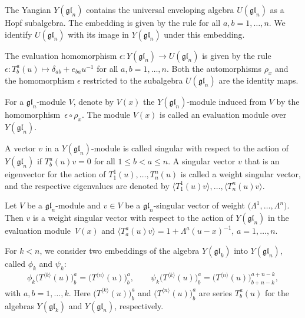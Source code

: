 \documentclass[10pt,a4paper]{amsart}
\numberwithin{equation}{section}
\begin{document}
The Yangian $Y(\mathfrak{g l}_{n})$ contains the universal enveloping algebra $U(\mathfrak{g l}_{n})$ as a Hopf subalgebra. The embedding is given by the rule  for all $a, b=1, \dots, n$. We identify $U(\mathfrak{g l}_{n})$ with its image in $Y(\mathfrak{g l}_{n})$ under this embedding.

The evaluation homomorphism $\epsilon\colon Y (\mathfrak{gl}_n) \rightarrow U(\mathfrak{gl}_n)$ is given by the rule $\epsilon\colon T_{b}^a(u) \mapsto \delta_{ab}+e_{ba}u^{-1}$ for all $a,b = 1,\dots,n$. Both the automorphisms $\rho_x$ and the homomorphism $\epsilon$ restricted to the subalgebra $U(\mathfrak{gl}_n)$ are the identity maps.

For a $\mathfrak{gl}_n$-module $V$, denote by $V(x)$ the $Y(\mathfrak{gl}_n)$-module induced from $V$ by the homomorphism~${\epsilon\circ \rho_x}$. The module $V(x)$ is called an evaluation module over $Y(\mathfrak{gl}_n)$.

A vector $v$ in a $Y(\mathfrak{gl}_n)$-module is called singular with respect to the action of $Y(\mathfrak{gl}_n)$ if ${T^{a}_{b}(u)v = 0}$ for all $1\leq b < a \leq n$. A singular vector $v$ that is an eigenvector for the action of $T_{1}^{1}(u),\dots,T_{n}^{n}(u)$ is called a weight singular vector, and the respective eigenvalues are denoted by $\bigl\langle T^1_{1}(u)v\bigr\rangle,\dots, \langle T^n_{n}(u)v\rangle$.

\begin{Example}%
Let $V$ be a $\mathfrak{g l}_{n}$-module and $v \in V$ be a $\mathfrak{gl}_n$-singular vector of weight $\bigl(\Lambda^{1}, \dots, \Lambda^{n}\bigr)$. Then $v$ is a weight singular vector with respect to the action of $Y(\mathfrak{g l}_{n})$ in the evaluation module~$V(x)$ and $\langle T^a_{ a}(u) v\rangle=1+\Lambda^{a}(u-x)^{-1}$, $a=1, \dots, n$.
\end{Example}

For $k<n$, we consider two embeddings of the algebra $Y(\mathfrak{gl}_{k})$ into $Y(\mathfrak{gl}_{n})$, called $\phi_k$ and $\psi_k$:
\begin{gather}\label{embeddings}
\phi_k\bigl(T^{\langle k\rangle}(u)\bigr)^a_b=\bigl(T^{\langle n\rangle}(u)\bigr)^a_b,\qquad
\psi_k\bigl(T^{\langle k\rangle}(u)\bigr)^a_b=\bigl(T^{\langle n\rangle}(u)\bigr)^{a+n-k}_{b+n-k},
\end{gather}
with $a,b=1,\dots, k$. Here $\bigl(T^{\langle k\rangle}(u)\bigr)^a_b$ and $\bigl(T^{\langle n\rangle}(u)\bigr)^a_b$ are series $T^a_b(u)$ for the algebras $Y(\mathfrak{gl}_{k})$ and $Y(\mathfrak{gl}_{n})$, respectively.
\end{document}
